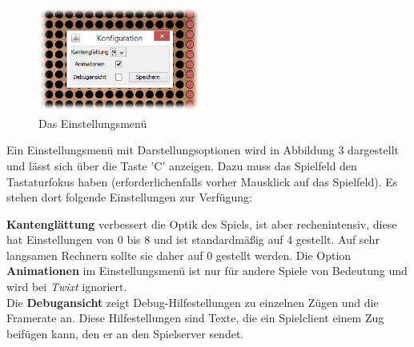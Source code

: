 \documentclass[a4paper, ngerman]{scrartcl}
\begin{document}
\begin{figure}
  \includegraphics[width=0.48\textwidth]{bilder/konfiguration.png}
  \centering
  \caption{Das Einstellungsmenü}\label{fig:Configuration}
\end{figure}

Ein Einstellungsmenü mit Darstellungsoptionen wird in Abbildung 3
dargestellt und lässt sich über die Taste 'C' anzeigen. Dazu muss das
Spielfeld den Tastaturfokus haben (erforderlichenfalls vorher
Mausklick auf das Spielfeld). Es stehen dort folgende Einstellungen
zur Verfügung:

\textbf{Kantenglättung} verbessert die Optik des
Spiels, ist aber rechenintensiv, diese hat Einstellungen von 0 bis 8 und ist
standardmäßig auf 4 gestellt.
Auf sehr langsamen Rechnern sollte sie daher auf 0 gestellt werden. Die Option
\textbf{Animationen} im Einstellungsmenü ist nur für andere Spiele von
Bedeutung und wird bei \emph{Twixt} ignoriert.\\
Die \textbf{Debugansicht} zeigt Debug-Hilfestellungen zu einzelnen Zügen und
die Framerate an.
Diese Hilfestellungen sind Texte, die ein Spielclient einem Zug beifügen kann, den er
an den Spielserver sendet.
\end{document}
